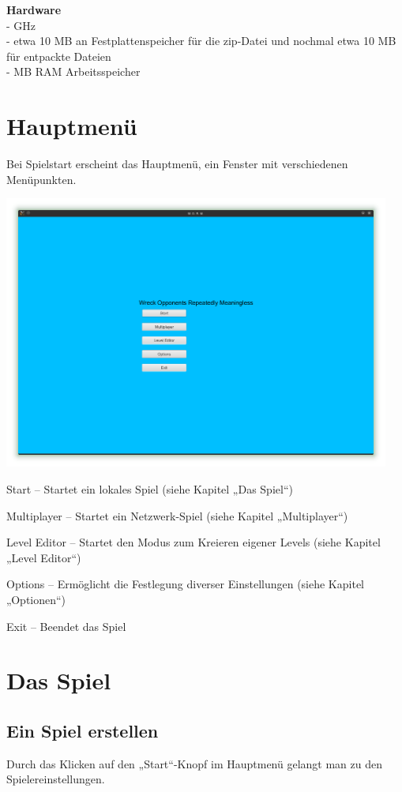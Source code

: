 \documentclass{scrreprt}
\begin{document}
\textbf{Hardware}
\\- GHz
\\- etwa 10 MB an Festplattenspeicher für die zip-Datei und nochmal etwa 10 MB für entpackte Dateien
\\- MB RAM Arbeitsspeicher

\chapter{Hauptmenü}
Bei Spielstart erscheint das Hauptmenü, ein Fenster mit verschiedenen Menüpunkten.

\includegraphics[height=9cm]{Screenshot1.png}

Start – Startet ein lokales Spiel (siehe Kapitel „Das Spiel“)

Multiplayer – Startet ein Netzwerk-Spiel (siehe Kapitel „Multiplayer“)

Level Editor – Startet den Modus zum Kreieren eigener Levels (siehe Kapitel „Level Editor“)

Options – Ermöglicht die Festlegung diverser Einstellungen (siehe Kapitel „Optionen“)

Exit – Beendet das Spiel

\chapter{Das Spiel}

\section{Ein Spiel erstellen}

Durch das Klicken auf den „Start“-Knopf im Hauptmenü gelangt man zu den Spielereinstellungen.
\end{document}
